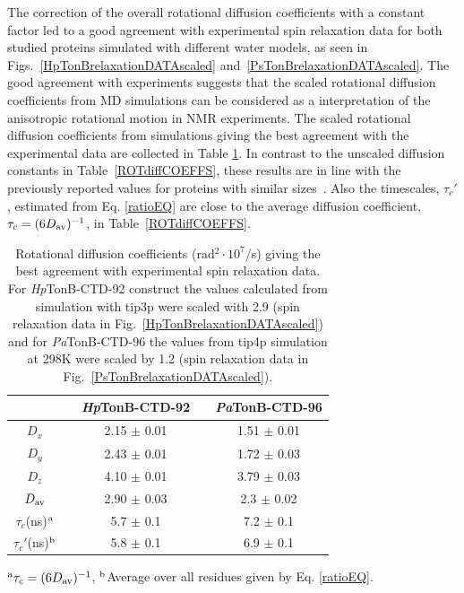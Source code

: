\documentclass[journal=jpcbfk,manuscript=article]{achemso}
\begin{document}
The correction of the overall rotational diffusion coefficients
with a constant factor led to a good agreement with experimental
spin relaxation data for both studied proteins simulated with different water models,
as seen in Figs.~\ref{HpTonBrelaxationDATAscaled} and~\ref{PsTonBrelaxationDATAscaled}.
The good agreement with experiments suggests that the scaled rotational diffusion coefficients
from MD simulations can be considered as a interpretation of the anisotropic rotational motion in NMR experiments.
The scaled rotational diffusion coefficients from simulations giving the best agreement
with the experimental data are collected in Table \ref{ROTdiffCOEFFSscaled}.
In contrast to the unscaled diffusion constants in Table~\ref{ROTdiffCOEFFS},
these results are in line with the previously reported values for proteins
with similar sizes~\cite{krishnan98}. Also the timescales, $\tau_{c}'$, estimated from 
Eq. \ref{ratioEQ} are close to the average diffusion coefficient, $\tau_{c}=(6D_{\rm av})^{-1}$,
in Table~\ref{ROTdiffCOEFFS}.
\begin{table}[!h]
  \centering
  \caption{Rotational diffusion coefficients (rad$^2\cdot 10^7$/s) giving the best agreement with experimental spin relaxation data.
    For {\it Hp}TonB-CTD-92 construct the values calculated from simulation with tip3p were scaled with 2.9
    (spin relaxation data in Fig.~\ref{HpTonBrelaxationDATAscaled}) and  for {\it Pa}TonB-CTD-96
    the values from tip4p simulation at 298K were scaled by 1.2 (spin relaxation data in
    Fig.~\ref{PsTonBrelaxationDATAscaled}). 
  }\label{ROTdiffCOEFFSscaled}
  \begin{tabular}{c c c c c}
    &    &  {\it Hp}TonB-CTD-92  &  & {\it Pa}TonB-CTD-96 \\
    \hline
    $D_{x}$        &    &   2.15 $\pm$ 0.01  & & 1.51  $\pm$ 0.01\\
    $D_{y}$        &    &  2.43  $\pm$ 0.01  & & 1.72  $\pm$ 0.03\\
    $D_{z}$        &    &  4.10   $\pm$ 0.01 & & 3.79  $\pm$ 0.03\\
    $D_{\rm av}$        &    &   2.90  $\pm$ 0.03  & & 2.3  $\pm$ 0.02\\
    $\tau_{c}$(ns)$^{\rm a}$  &    &  5.7   $\pm$ 0.1  & & 7.2 $\pm$ 0.1 \\
    $\tau_{c}'$(ns)$^{\rm b}$  &    &  5.8   $\pm$ 0.1 & & 6.9   $\pm$ 0.1 \\
  \end{tabular}
  \newline
  \flushleft
  $^{\rm a}\tau_{c}=(6D_{\rm av})^{-1}$, $^{\rm b}$Average over all residues given by Eq. \ref{ratioEQ}.
\end{table} 
\end{document}
